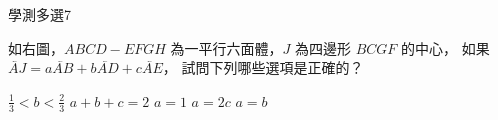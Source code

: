     \begin{QUESTION}
        \begin{ExamInfo}{92}{學測}{多選}{7}
        \end{ExamInfo}
        \begin{ExamAnsRateInfo}{45}{79}{41}{15}
        \end{ExamAnsRateInfo}
        \begin{QBODY}
            如右圖，$ABCD-EFGH$ 為一平行六面體，$J$ 為四邊形 $BCGF$ 的中心，
            如果 $\lvec{AJ} = a \lvec{AB} + b\lvec{AD}+ c\lvec{AE}$，
            試問下列哪些選項是正確的？ 
            \begin{QOPS} 
                \QOP $\frac{1}{3} < b < \frac{2}{3}$ 
                \QOP $a + b + c = 2$  
                \QOP $a=1$
                \QOP $a=2c$ 
                \QOP $a=b$
            \end{QOPS}
        

\end{QBODY}
\end{QUESTION}
